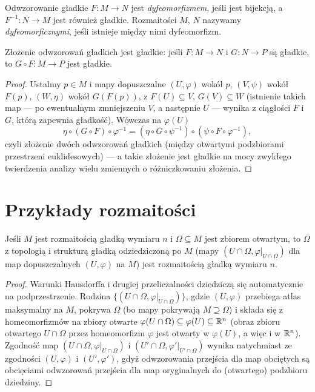 \begin{definicja}\label{def dyfeo}
Odwzorowanie gładkie $F\colon M\to N$ jest \emph{dyfeomorfizmem}, jeśli jest bijekcją, a
$F^{-1}\colon N\to M$ jest również gładkie. Rozmaitości $M$, $N$ nazywamy
\emph{dyfeomorficznymi}, jeśli istnieje między nimi dyfeomorfizm.
\end{definicja}

\begin{stwierdzenie}
Złożenie odwzorowań gładkich jest gładkie: jeśli $F\colon M\to N$ i $G\colon N\to P$ są
gładkie, to $G\circ F\colon M\to P$ jest gładkie.
\end{stwierdzenie}

\begin{proof}
Ustalmy $p\in M$ i mapy dopuszczalne $(U,\varphi)$ wokół $p$, $(V,\psi)$ wokół $F(p)$,
$(W,\eta)$ wokół $G(F(p))$, z $F(U)\subseteq V$, $G(V)\subseteq W$ (istnienie takich map —
po ewentualnym zmniejszeniu $V$, a następnie $U$ — wynika z ciągłości $F$ i $G$, którą zapewnia gładkość).
Wówczas na $\varphi(U)$
\[
\eta\circ(G\circ F)\circ\varphi^{-1}=(\eta\circ G\circ\psi^{-1})\circ(\psi\circ F\circ
\varphi^{-1}),
\]
czyli złożenie dwóch odwzorowań gładkich (między otwartymi podzbiorami przestrzeni
euklidesowych) — a takie złożenie jest gładkie na mocy zwykłego twierdzenia analizy wielu
zmiennych o różniczkowaniu złożenia.
\end{proof}
\section{Przykłady rozmaitości}

\begin{stwierdzenie}\label{stw:otwarty-podzbior}
Jeśli $M$ jest rozmaitością gładką wymiaru $n$ i $\Omega\subseteq M$ jest zbiorem otwartym,
to $\Omega$ z topologią i strukturą gładką odziedziczoną po $M$ (mapy $(U\cap\Omega,
\varphi|_{U\cap\Omega})$ dla map dopuszczalnych $(U,\varphi)$ na $M$) jest rozmaitością
gładką wymiaru $n$.
\end{stwierdzenie}

\begin{proof}
Warunki Hausdorffa i drugiej przeliczalności dziedziczą się automatycznie na
podprzestrzenie. Rodzina $\{(U\cap\Omega,\varphi|_{U\cap\Omega})\}$, gdzie $(U,\varphi)$
przebiega atlas maksymalny na $M$, pokrywa $\Omega$ (bo mapy pokrywają $M\supseteq\Omega$)
i składa się z homeomorfizmów na zbiory otwarte $\varphi(U\cap\Omega)\subseteq\varphi(U)
\subseteq\mathbb{R}^n$ (obraz zbioru otwartego $U\cap\Omega$ przez homeomorfizm $\varphi$ jest
otwarty w $\varphi(U)$, a więc i w $\mathbb{R}^n$). Zgodność map $(U\cap\Omega,\varphi|_{U\cap
\Omega})$ i $(U'\cap\Omega,\varphi'|_{U'\cap\Omega})$ wynika natychmiast ze zgodności
$(U,\varphi)$ i $(U',\varphi')$, gdyż odwzorowania przejścia dla map obciętych są
obcięciami odwzorowań przejścia dla map oryginalnych do (otwartego) podzbioru dziedziny.
\end{proof}

